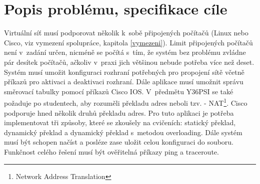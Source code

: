 \chapter{Popis problému, specifikace cíle}


Virtuální síť musí podporovat několik k~sobě připojených počítačů (Linux nebo Cisco, viz vymezení spolupráce, kapitola \ref{vymezeni}). Limit připojených počítačů není v~zadání určen, nicméně se počítá s~tím, že systém bez problému zvládne pár desítek počítačů, ačkoliv v~praxi jich většinou nebude potřeba více než deset. Systém musí umožit konfiguraci rozhraní potřebných pro propojení sítě včetně příkazů pro aktivaci a deaktivaci rozhraní. Dále aplikace musí umožnit správu směrovací tabulky pomocí příkazů Cisco IOS. V~předmětu Y36PSI se také požaduje po studentech, aby rozuměli překladu adres neboli tzv.  - NAT\footnote{Network Address Translation}. Cisco podporuje hned několik druhů překladu adres. Pro tuto aplikaci je potřeba implementovat tři způsoby, které se zkoušely na cvičeních: statický překlad, dynamický překlad a dynamický překlad s~metodou overloading. Dále systém musí být schopen načíst a posléze zase uložit celou konfiguraci do souboru. Funkčnost celého řešení musí být ověřitelná příkazy ping a traceroute.

